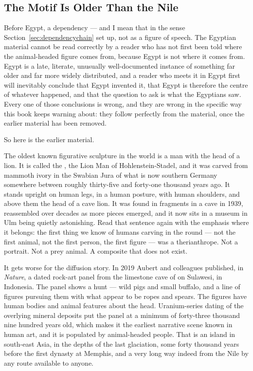 \subsection{The Motif Is Older Than the Nile}\label{sec:oldermotif}

Before Egypt, a dependency --- and I mean that in the sense Section~\ref{sec:dependencychain} set
up, not as a figure of speech. The Egyptian material cannot be read correctly by a reader who has
not first been told where the animal-headed figure comes from, because Egypt is not where it comes
from. Egypt is a late, literate, unusually well-documented instance of something far older and far
more widely distributed, and a reader who meets it in Egypt first will inevitably conclude that
Egypt invented it, that Egypt is therefore the centre of whatever happened, and that the question
to ask is what the Egyptians saw. Every one of those conclusions is wrong, and they are wrong in
the specific way this book keeps warning about: they follow perfectly from the material, once the
earlier material has been removed.

So here is the earlier material.

The oldest known figurative sculpture in the world is a man with the head of a lion. It is called
the , the Lion Man of Hohlenstein-Stadel, and it was carved from mammoth ivory in
the Swabian Jura of what is now southern Germany somewhere between roughly thirty-five and
forty-one thousand years ago. It stands upright on human legs, in a human posture, with human
shoulders, and above them the head of a cave lion. It was found in fragments in a cave in 1939,
reassembled over decades as more pieces emerged, and it now sits in a museum in Ulm being quietly
astonishing. Read that sentence again with the emphasis where it belongs: the first thing we know
of humans carving in the round --- not the first animal, not the first person, the first figure ---
was a therianthrope. Not a portrait. Not a prey animal. A composite that does not exist.

It gets worse for the diffusion story. In 2019 Aubert and colleagues published, in
\emph{Nature}, a dated rock-art panel from the limestone cave of  on
Sulawesi, in Indonesia. The panel shows a hunt --- wild pigs and small buffalo, and a line of
figures pursuing them with what appear to be ropes and spears. The figures have human bodies and
animal features about the head. Uranium-series dating of the overlying mineral deposits put the
panel at a minimum of forty-three thousand nine hundred years old, which makes it the earliest
narrative scene known in human art, and it is populated by animal-headed people. That is an island
in south-east Asia, in the depths of the last glaciation, some forty thousand years before the
first dynasty at Memphis, and a very long way indeed from the Nile by any route available to anyone.

